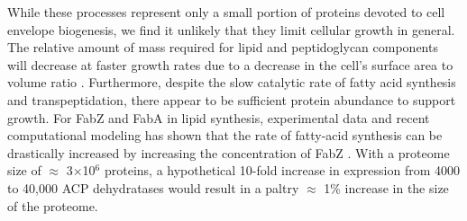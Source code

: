 While these processes represent only a small portion of
proteins devoted to cell envelope biogenesis, we find it unlikely that they
limit cellular growth in general. The relative amount of mass required for
lipid and peptidoglycan components will decrease at faster growth rates due to a
decrease in the cell's surface area to volume ratio \citep{ojkic2019}.
Furthermore, despite the slow catalytic rate of fatty acid synthesis and transpeptidation,
there appear to be sufficient protein abundance to support growth.
For FabZ and FabA in lipid
synthesis, experimental data and recent computational modeling has shown that
the rate of fatty-acid synthesis can be drastically increased by increasing
the concentration of FabZ \citep{yu2011, ruppe2018}. With a proteome size of
$\approx$ 3$\times$10$^6$ proteins, a hypothetical 10-fold increase in
expression from 4000 to 40,000 ACP dehydratases would result in a paltry
$\approx$ 1\% increase in the size of the proteome.


